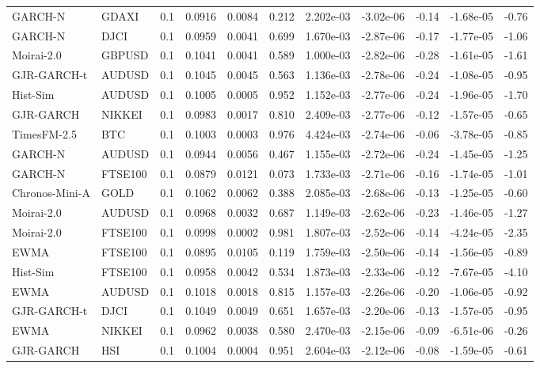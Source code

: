 \begin{tabular}{llrrrrrrrrr}
GARCH-N & GDAXI & 0.1 & 0.0916 & 0.0084 & 0.212 & 2.202e-03 & -3.02e-06 & -0.14 & -1.68e-05 & -0.76 \\
GARCH-N & DJCI & 0.1 & 0.0959 & 0.0041 & 0.699 & 1.670e-03 & -2.87e-06 & -0.17 & -1.77e-05 & -1.06 \\
Moirai-2.0 & GBPUSD & 0.1 & 0.1041 & 0.0041 & 0.589 & 1.000e-03 & -2.82e-06 & -0.28 & -1.61e-05 & -1.61 \\
GJR-GARCH-t & AUDUSD & 0.1 & 0.1045 & 0.0045 & 0.563 & 1.136e-03 & -2.78e-06 & -0.24 & -1.08e-05 & -0.95 \\
Hist-Sim & AUDUSD & 0.1 & 0.1005 & 0.0005 & 0.952 & 1.152e-03 & -2.77e-06 & -0.24 & -1.96e-05 & -1.70 \\
GJR-GARCH & NIKKEI & 0.1 & 0.0983 & 0.0017 & 0.810 & 2.409e-03 & -2.77e-06 & -0.12 & -1.57e-05 & -0.65 \\
TimesFM-2.5 & BTC & 0.1 & 0.1003 & 0.0003 & 0.976 & 4.424e-03 & -2.74e-06 & -0.06 & -3.78e-05 & -0.85 \\
GARCH-N & AUDUSD & 0.1 & 0.0944 & 0.0056 & 0.467 & 1.155e-03 & -2.72e-06 & -0.24 & -1.45e-05 & -1.25 \\
GARCH-N & FTSE100 & 0.1 & 0.0879 & 0.0121 & 0.073 & 1.733e-03 & -2.71e-06 & -0.16 & -1.74e-05 & -1.01 \\
Chronos-Mini-A & GOLD & 0.1 & 0.1062 & 0.0062 & 0.388 & 2.085e-03 & -2.68e-06 & -0.13 & -1.25e-05 & -0.60 \\
Moirai-2.0 & AUDUSD & 0.1 & 0.0968 & 0.0032 & 0.687 & 1.149e-03 & -2.62e-06 & -0.23 & -1.46e-05 & -1.27 \\
Moirai-2.0 & FTSE100 & 0.1 & 0.0998 & 0.0002 & 0.981 & 1.807e-03 & -2.52e-06 & -0.14 & -4.24e-05 & -2.35 \\
EWMA & FTSE100 & 0.1 & 0.0895 & 0.0105 & 0.119 & 1.759e-03 & -2.50e-06 & -0.14 & -1.56e-05 & -0.89 \\
Hist-Sim & FTSE100 & 0.1 & 0.0958 & 0.0042 & 0.534 & 1.873e-03 & -2.33e-06 & -0.12 & -7.67e-05 & -4.10 \\
EWMA & AUDUSD & 0.1 & 0.1018 & 0.0018 & 0.815 & 1.157e-03 & -2.26e-06 & -0.20 & -1.06e-05 & -0.92 \\
GJR-GARCH-t & DJCI & 0.1 & 0.1049 & 0.0049 & 0.651 & 1.657e-03 & -2.20e-06 & -0.13 & -1.57e-05 & -0.95 \\
EWMA & NIKKEI & 0.1 & 0.0962 & 0.0038 & 0.580 & 2.470e-03 & -2.15e-06 & -0.09 & -6.51e-06 & -0.26 \\
GJR-GARCH & HSI & 0.1 & 0.1004 & 0.0004 & 0.951 & 2.604e-03 & -2.12e-06 & -0.08 & -1.59e-05 & -0.61 \\

\end{tabular}

